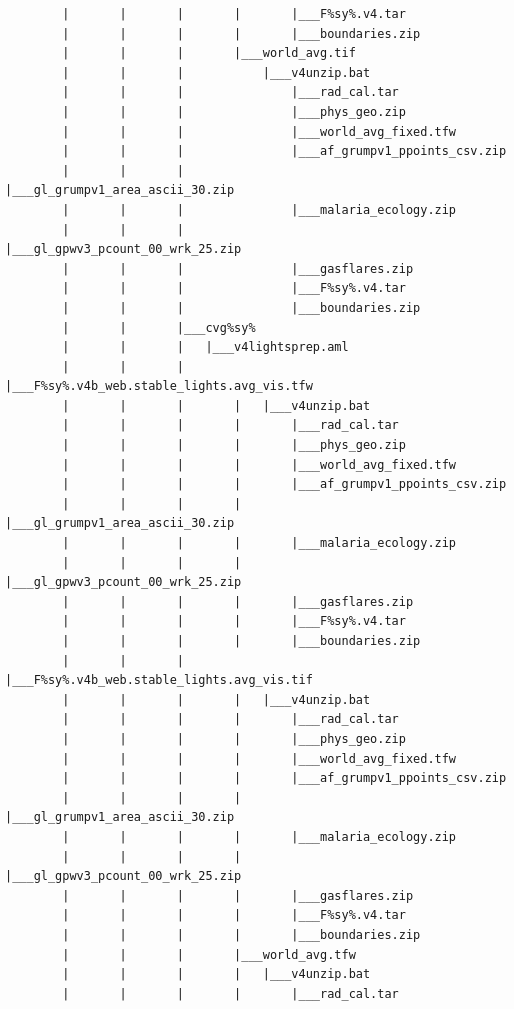 \documentclass[]{book}
\begin{document}
\begin{verbatim}
        |       |       |       |       |___F%sy%.v4.tar
        |       |       |       |       |___boundaries.zip
        |       |       |       |___world_avg.tif
        |       |       |           |___v4unzip.bat
        |       |       |               |___rad_cal.tar
        |       |       |               |___phys_geo.zip
        |       |       |               |___world_avg_fixed.tfw
        |       |       |               |___af_grumpv1_ppoints_csv.zip
        |       |       |               |___gl_grumpv1_area_ascii_30.zip
        |       |       |               |___malaria_ecology.zip
        |       |       |               |___gl_gpwv3_pcount_00_wrk_25.zip
        |       |       |               |___gasflares.zip
        |       |       |               |___F%sy%.v4.tar
        |       |       |               |___boundaries.zip
        |       |       |___cvg%sy%
        |       |       |   |___v4lightsprep.aml
        |       |       |       |___F%sy%.v4b_web.stable_lights.avg_vis.tfw
        |       |       |       |   |___v4unzip.bat
        |       |       |       |       |___rad_cal.tar
        |       |       |       |       |___phys_geo.zip
        |       |       |       |       |___world_avg_fixed.tfw
        |       |       |       |       |___af_grumpv1_ppoints_csv.zip
        |       |       |       |       |___gl_grumpv1_area_ascii_30.zip
        |       |       |       |       |___malaria_ecology.zip
        |       |       |       |       |___gl_gpwv3_pcount_00_wrk_25.zip
        |       |       |       |       |___gasflares.zip
        |       |       |       |       |___F%sy%.v4.tar
        |       |       |       |       |___boundaries.zip
        |       |       |       |___F%sy%.v4b_web.stable_lights.avg_vis.tif
        |       |       |       |   |___v4unzip.bat
        |       |       |       |       |___rad_cal.tar
        |       |       |       |       |___phys_geo.zip
        |       |       |       |       |___world_avg_fixed.tfw
        |       |       |       |       |___af_grumpv1_ppoints_csv.zip
        |       |       |       |       |___gl_grumpv1_area_ascii_30.zip
        |       |       |       |       |___malaria_ecology.zip
        |       |       |       |       |___gl_gpwv3_pcount_00_wrk_25.zip
        |       |       |       |       |___gasflares.zip
        |       |       |       |       |___F%sy%.v4.tar
        |       |       |       |       |___boundaries.zip
        |       |       |       |___world_avg.tfw
        |       |       |       |   |___v4unzip.bat
        |       |       |       |       |___rad_cal.tar

\end{verbatim}
\end{document}
